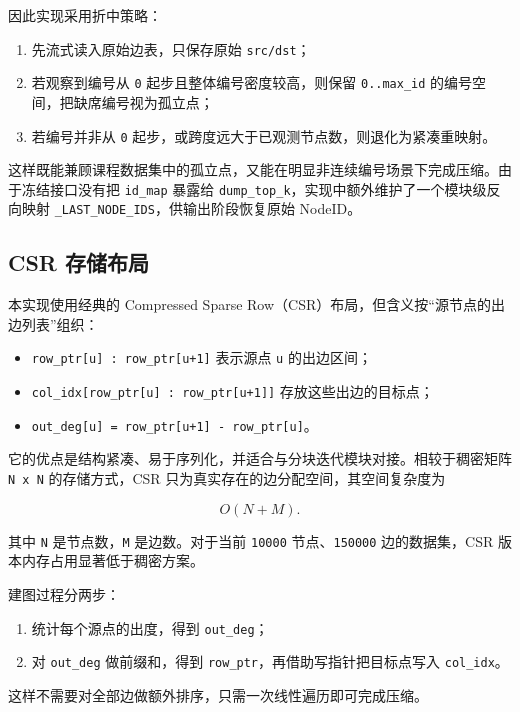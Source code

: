 \documentclass[UTF8,a4paper,12pt]{ctexart}
\begin{document}
因此实现采用折中策略：


\begin{enumerate}
\item 先流式读入原始边表，只保存原始 \texttt{src/dst}；
\item 若观察到编号从 \texttt{0} 起步且整体编号密度较高，则保留 \texttt{0..max\_id} 的编号空间，把缺席编号视为孤立点；
\item 若编号并非从 \texttt{0} 起步，或跨度远大于已观测节点数，则退化为紧凑重映射。
\end{enumerate}


这样既能兼顾课程数据集中的孤立点，又能在明显非连续编号场景下完成压缩。由于冻结接口没有把 \texttt{id\_map} 暴露给 \texttt{dump\_top\_k}，实现中额外维护了一个模块级反向映射 \texttt{\_LAST\_NODE\_IDS}，供输出阶段恢复原始 NodeID。


\subsection{CSR 存储布局}


本实现使用经典的 Compressed Sparse Row（CSR）布局，但含义按“源节点的出边列表”组织：


\begin{itemize}
\item \texttt{row\_ptr[u] : row\_ptr[u+1]} 表示源点 \texttt{u} 的出边区间；
\item \texttt{col\_idx[row\_ptr[u] : row\_ptr[u+1]]} 存放这些出边的目标点；
\item \texttt{out\_deg[u] = row\_ptr[u+1] - row\_ptr[u]}。
\end{itemize}


它的优点是结构紧凑、易于序列化，并适合与分块迭代模块对接。相较于稠密矩阵 \texttt{N x N} 的存储方式，CSR 只为真实存在的边分配空间，其空间复杂度为


\[ O(N + M). \]


其中 \texttt{N} 是节点数，\texttt{M} 是边数。对于当前 \texttt{10000} 节点、\texttt{150000} 边的数据集，CSR 版本内存占用显著低于稠密方案。


建图过程分两步：


\begin{enumerate}
\item 统计每个源点的出度，得到 \texttt{out\_deg}；
\item 对 \texttt{out\_deg} 做前缀和，得到 \texttt{row\_ptr}，再借助写指针把目标点写入 \texttt{col\_idx}。
\end{enumerate}


这样不需要对全部边做额外排序，只需一次线性遍历即可完成压缩。
\end{document}
